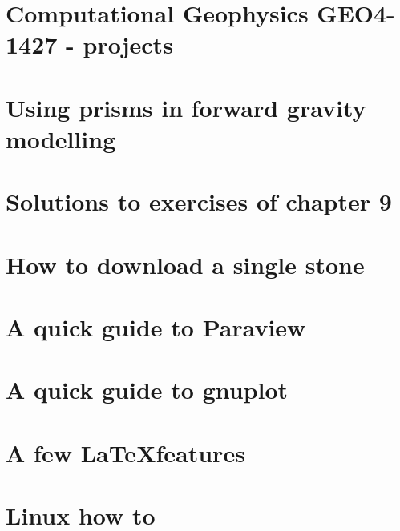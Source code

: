 \documentclass[a4paper]{article}
\numberwithin{equation}{section}
\begin{document}
\section{Computational Geophysics GEO4-1427 - projects}  %
\newpage %
\section{Using prisms in forward gravity modelling \label{app:prisms}} 
\newpage %
\section{Solutions to exercises of chapter 9 \label{app:gravsols}}  %
\newpage %
\section{How to download a single stone}  %
\newpage %
\section{A quick guide to Paraview}  %
\newpage %
\section{A quick guide to gnuplot}  %
\newpage %
\section{A few \LaTeX features}  %
\newpage %
\section{Linux how to}  %
\end{document}
